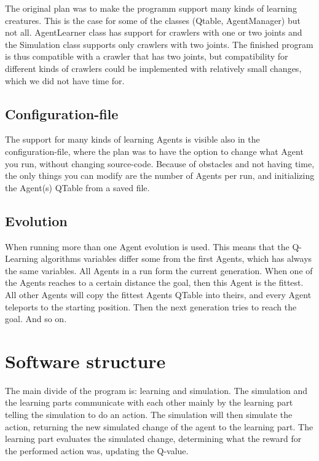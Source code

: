 \documentclass{article}
\begin{document}
The original plan was to make the programm support many kinds of learning
creatures. This is the case for some of the classes (Qtable, AgentManager)
but not all. AgentLearner class has support for crawlers with one or two joints
and the Simulation class supports only crawlers with two joints. The finished
program is thus compatible with a crawler that has two joints, but compatibility
for different kinds of crawlers could be implemented with relatively small
changes, which we did not have time for.

\subsection{Configuration-file}
The support for many kinds of learning Agents is visible also in the
configuration-file, where the plan was to have the option to change what
Agent you run, without changing source-code. Because of obstacles and
not having time, the only things you can modify are the number of Agents
per run, and initializing the Agent(s) QTable from a saved file.

\subsection{Evolution}
When running more than one Agent evolution is used. This means that the
Q-Learning algorithms variables differ some from the first Agents, which
has always the same variables.
All Agents in a run form the current generation. When one of the Agents
reaches to a certain distance the goal, then this Agent is the fittest. All
other Agents will copy the fittest Agents QTable into theirs, and every Agent
teleports to the starting position. Then the next generation tries to
reach the goal. And so on.


\section{Software structure}
The main divide of the program is: learning and simulation. The
simulation and the learning parts communicate with each other mainly by the
learning part telling the simulation to do an action. The simulation will then
simulate the action, returning the new simulated change of the agent to the
learning part. The learning part evaluates the simulated change, determining
what the reward for the performed action was, updating the Q-value.
\end{document}
